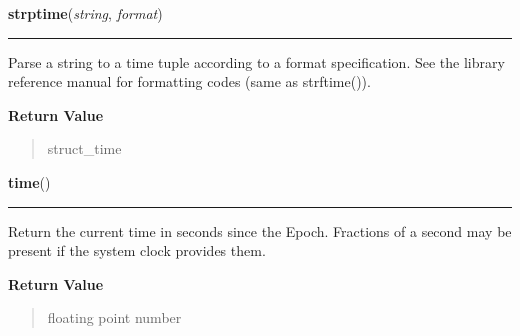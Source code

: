 \hspace{.8\funcindent}\begin{boxedminipage}{\funcwidth}

    \raggedright \textbf{strptime}(\textit{string}, \textit{format})

    \vspace{-1.5ex}

    \rule{\textwidth}{0.5\fboxrule}
\setlength{\parskip}{2ex}
    Parse a string to a time tuple according to a format specification. See
    the library reference manual for formatting codes (same as strftime()).

\setlength{\parskip}{1ex}
      \textbf{Return Value}
    \vspace{-1ex}

      \begin{quote}
      struct\_time

      \end{quote}

    \end{boxedminipage}

    \label{time:time}

    \vspace{0.5ex}

\hspace{.8\funcindent}\begin{boxedminipage}{\funcwidth}

    \raggedright \textbf{time}()

    \vspace{-1.5ex}

    \rule{\textwidth}{0.5\fboxrule}
\setlength{\parskip}{2ex}
    Return the current time in seconds since the Epoch. Fractions of a 
    second may be present if the system clock provides them.

\setlength{\parskip}{1ex}
      \textbf{Return Value}
    \vspace{-1ex}

      \begin{quote}
      floating point number

      \end{quote}

    \end{boxedminipage}

    \label{time:tzset}

    \vspace{0.5ex}

